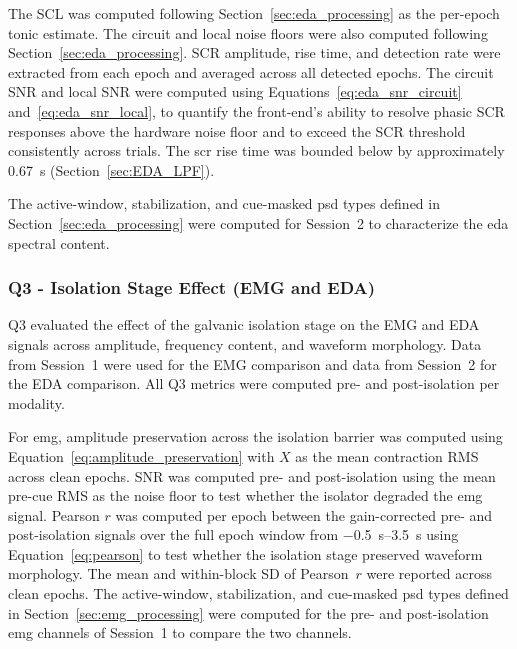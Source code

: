 The SCL was computed following Section~\ref{sec:eda_processing} as the per-epoch tonic estimate. The circuit and local noise floors were also computed following Section~\ref{sec:eda_processing}. SCR amplitude, rise time, and detection rate were extracted from each epoch and averaged across all detected epochs. The circuit SNR and local SNR were computed using Equations~\ref{eq:eda_snr_circuit} and~\ref{eq:eda_snr_local}, to quantify the front-end's ability to resolve phasic SCR responses above the hardware noise floor and to exceed the SCR threshold consistently across trials. The \gls{scr} rise time was bounded below by approximately \SI{0.67}{\second} (Section~\ref{sec:EDA_LPF}).

The active-window, stabilization, and cue-masked \gls{psd} types defined in Section~\ref{sec:eda_processing} were computed for Session~2 to characterize the \gls{eda} spectral content.

\subsubsection{Q3 - Isolation Stage Effect (EMG and EDA)}
\label{sec:q3_isolation_stage}

Q3 evaluated the effect of the galvanic isolation stage on the EMG and EDA signals across amplitude, frequency content, and waveform morphology. Data from Session~1 were used for the EMG comparison and data from Session~2 for the EDA comparison. All Q3 metrics were computed pre- and post-isolation per modality.

For \gls{emg}, amplitude preservation across the isolation barrier was computed using Equation~\ref{eq:amplitude_preservation} with $X$ as the mean contraction RMS across clean epochs. SNR was computed pre- and post-isolation using the mean pre-cue RMS as the noise floor to test whether the isolator degraded the \gls{emg} signal. Pearson $r$ was computed per epoch between the gain-corrected pre- and post-isolation signals over the full epoch window from \SIrange{-0.5}{3.5}{\second} using Equation~\ref{eq:pearson} to test whether the isolation stage preserved waveform morphology. The mean and within-block SD of Pearson~$r$ were reported across clean epochs. The active-window, stabilization, and cue-masked \gls{psd} types defined in Section~\ref{sec:emg_processing} were computed for the pre- and post-isolation \gls{emg} channels of Session~1 to compare the two channels.

